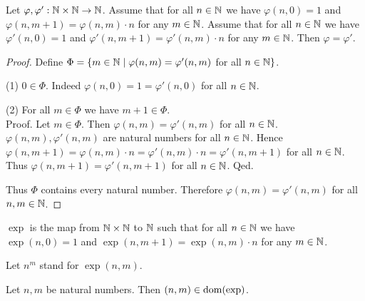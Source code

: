 \documentclass[10pt]{article}
\begin{document}
  \begin{forthel}
    \begin{lemma}
      Let $\varphi, \varphi' : \mathbb{N} \times \mathbb{N} \to \mathbb{N}$.
      Assume that for all $n \in \mathbb{N}$ we have $\varphi(n, 0) = 1$ and
      $\varphi(n, m + 1) = \varphi(n,m) \cdot n$ for any $m \in \mathbb{N}$.
      Assume that for all $n \in \mathbb{N}$ we have $\varphi'(n, 0) = 1$ and
      $\varphi'(n, m + 1) = \varphi'(n,m) \cdot n$ for any $m \in \mathbb{N}$.
      Then $\varphi = \varphi'$.
    \end{lemma}
    \begin{proof}
      Define $\Phi = \{ m \in \mathbb{N} \mid \varphi(n,m) = \varphi'(n,m)$ for
      all $n \in \mathbb{N} \}$.

      (1) $0 \in \Phi$.
      Indeed $\varphi(n,0) = 1 = \varphi'(n,0)$ for all $n \in \mathbb{N}$.

      (2) For all $m \in \Phi$ we have $m + 1 \in \Phi$. \\
      Proof.
        Let $m \in \Phi$.
        Then $\varphi(n,m) = \varphi'(n,m)$ for all $n \in \mathbb{N}$.
        $\varphi(n,m), \varphi'(n,m)$ are natural numbers for all $n \in \mathbb{N}$. %
        Hence $\varphi(n, m + 1)
          = \varphi(n,m) \cdot n
          = \varphi'(n,m) \cdot n
          = \varphi'(n, m + 1)$
        for all $n \in \mathbb{N}$.
        Thus $\varphi(n,m + 1) = \varphi'(n,m + 1)$ for all $n \in \mathbb{N}$.
      Qed.

      Thus $\Phi$ contains every natural number.
      Therefore $\varphi(n,m) = \varphi'(n,m)$ for all $n, m \in \mathbb{N}$.
    \end{proof}
  \end{forthel}

  \begin{forthel}
    \begin{definition}
      $\exp$ is the map from $\mathbb{N} \times \mathbb{N}$ to $\mathbb{N}$ such that for all
      $n \in \mathbb{N}$ we have $\exp(n, 0) = 1$ and $\exp(n, m + 1) =
      \exp(n, m) \cdot n$ for any $m \in \mathbb{N}$.
    \end{definition}

    Let $n^{m}$ stand for $\exp(n,m)$.
  \end{forthel}

  \begin{forthel}
    \begin{lemma}
      Let $n, m$ be natural numbers.
      Then $(n,m) \in \operatorname{dom}(\textrm{exp})$.
    \end{lemma}
  \end{forthel}
\end{document}
